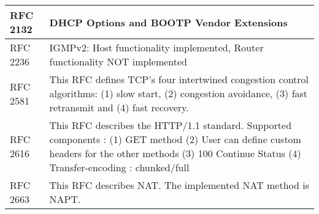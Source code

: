 \begin{longtable}{ | l | p{13cm} | }
RFC 2132 &
DHCP Options and BOOTP Vendor Extensions \\ \hline

RFC 2236 &
IGMPv2: Host functionality implemented, Router functionality NOT implemented \\ \hline

RFC 2581 &
This RFC defines TCP's four intertwined congestion control algorithms: (1) slow start, (2) congestion avoidance, (3) fast retransmit and (4) fast recovery. \\ \hline

RFC 2616 &
This RFC describes the HTTP/1.1 standard. Supported components : 
(1) GET method (2) User can define custom headers for the other methods 
(3) 100 Continue Status (4) Transfer-encoding : chunked/full  \\ \hline


RFC 2663 &
This RFC describes NAT. The implemented NAT method is NAPT.  \\ \hline


\end{longtable}

